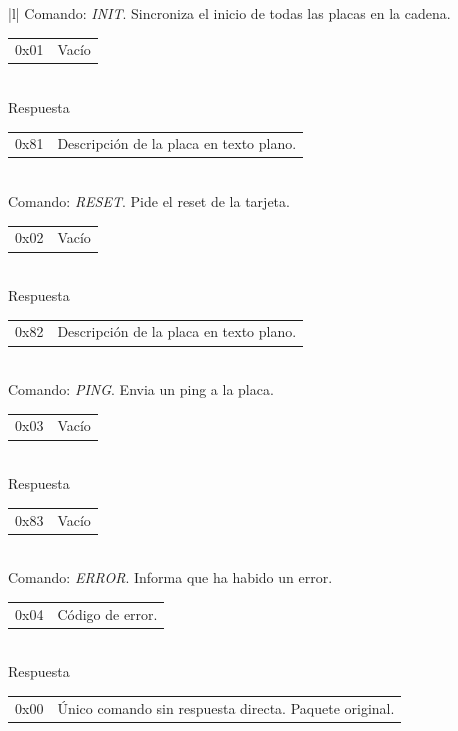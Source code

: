 \begin{table}[ht]
	\begin{center}
		\begin{tabular}{|l|}
			\hline
			Comando: \emph{INIT}. Sincroniza el inicio de todas las placas en la cadena. \\
			\hline
			\begin{tabular}{c|l}
				0x01 & Vac\'io \\
			\end{tabular}
			\\
			\hline
			Respuesta \\
			\hline
			\begin{tabular}{c|l}
				0x81 & Descripci\'on de la placa en texto plano. \\
			\end{tabular}
			\\

			\hline\hline
			Comando: \emph{RESET}. Pide el reset de la tarjeta. \\
			\hline
			\begin{tabular}{c|l}
				0x02 & Vac\'io \\
			\end{tabular}
			\\
			\hline
			Respuesta \\
			\hline
			\begin{tabular}{c|l}
				0x82 & Descripci\'on de la placa en texto plano. \\
			\end{tabular}
			\\

			\hline\hline
			Comando: \emph{PING}. Envia un ping a la placa. \\
			\hline
			\begin{tabular}{c|l}
				0x03 & Vac\'io \\
			\end{tabular}
			\\
			\hline
			Respuesta \\
			\hline
			\begin{tabular}{c|l}
				0x83 & Vac\'io \\
			\end{tabular}
			\\

			\hline\hline
			Comando: \emph{ERROR}. Informa que ha habido un error. \\
			\hline
			\begin{tabular}{c|l}
				0x04 & C\'odigo de error. \\
			\end{tabular}
			\\
			\hline
			Respuesta \\
			\hline
			\begin{tabular}{c|l}
				0x00 & \'Unico comando sin respuesta directa. Paquete original. \\
			\end{tabular}
			\\


\end{tabular}
\end{center}
\end{table}

